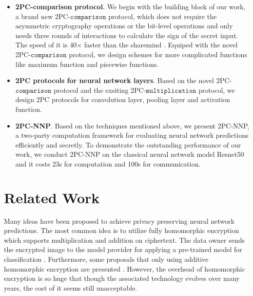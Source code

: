 \documentclass[letterpaper]{article} %
\begin{document}
    \begin{itemize}
        \item \textbf{2PC-comparison protocol}.
        We begin with the building block of our work, a brand new 2PC-$\mathtt{comparison}$ protocol,
        which does not require the asymmetric cryptography operations or the bit-level operations
        and only needs three rounds of interactions to calculate the sign of the secret input.
        The speed of it is 40$\times$ faster than the sharemind \cite{Sharemind}.
        Equiped with the novel 2PC-$\mathtt{comparison}$ protocol, we design schemes for more complicated functions
        like maximum function and piecewise functions.

        \item \textbf{2PC protocols for neural network layers}.
        Based on the novel 2PC-$\mathtt{comparison}$ protocol and the exsiting 2PC-$\mathtt{multiplication}$ protocol,
        we design 2PC protocols for convolution layer, pooling layer and activation function.

        \item \textbf{2PC-NNP}.
        Based on the techniques mentioned above,
        we present 2PC-NNP, a two-party computation framework
        for evaluating neural network predictions efficiently and secretly.
        To demonstrate the outstanding performance of our work,
        we conduct 2PC-NNP on the classical neural network model Resnet50 and
        it costs 23s for computation and 100s for communication.

    \end{itemize}






\section{Related Work}


    Many ideas have been proposed to achieve privacy preserving neural network predictions.
    The most common idea is to utilize fully homomorphic encryption which supports multiplication and addition on ciphertext.
    The data owner sends the encrypted image to the model provider for applying a pre-trained model for classification \cite{SEAL}.
    Furthermore, some proposals that only using additive homomorphic encryption are presented \cite{Homomorphic1} \cite{Homomorphic2}.
    However, the overhead of homomorphic encryption is so huge that though
    the associated technology evolves over many years\cite{ObliviousNeuralNetwork}, the cost of it seems still unacceptable.
\end{document}
